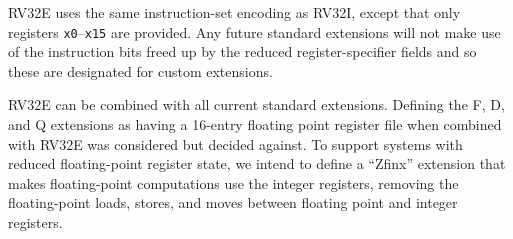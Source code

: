 RV32E uses the same instruction-set encoding as RV32I, except that
only registers {\tt x0}--{\tt x15} are provided.  Any future standard
extensions will not make use of the instruction bits freed up by the
reduced register-specifier fields and so these are designated for
custom extensions.

\begin{commentary}
RV32E can be combined with all current standard extensions. Defining the F, D,
and Q extensions as having a 16-entry floating point register file when
combined with RV32E was considered but decided against. To support
systems with reduced floating-point register state, we intend to
define a ``Zfinx'' extension that makes floating-point computations use the
integer registers, removing the floating-point loads, stores, and moves between
floating point and integer registers.
\end{commentary}
